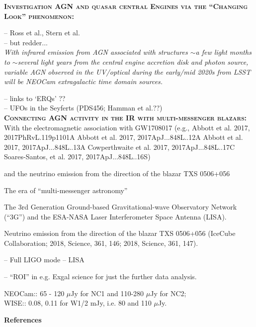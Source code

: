 \documentclass[12pt]{article}
\begin{document}
\smallskip
\smallskip
\noindent
\textbf{\textsc{Investigation AGN and quasar central Engines via the ``Changing Look'' phenomenon:}}

\smallskip
\smallskip
\noindent
-- Ross et al., Stern et al. \\
-- but redder...\\

{\it With infrared emission from AGN associated with structures $\sim$a few light months to $\sim$several light years from the central engine accretion disk and photon source, variable AGN observed in the UV/optical during the early/mid 2020s from LSST will be NEOCam extragalactic time domain sources.}


\smallskip
\smallskip
\noindent
-- links to `ERQs' ?? \\
-- UFOs in the Seyferts (PDS456; Hamman et al.??) \\

\smallskip
\smallskip
\noindent
\textbf{\textsc{Connecting AGN activity in the IR with multi-messenger blazars: }}
With the electromagnetic association with GW1708017 (e.g., 
Abbott et al. 2017,  2017PhRvL.119p1101A	
Abbott et al. 2017,  2017ApJ...848L..12A	
Abbott et al. 2017,  2017ApJ...848L..13A	
Cowperthwaite et al. 2017,  2017ApJ...848L..17C	
Soares-Santos, et al. 2017,  2017ApJ...848L..16S)	

and the neutrino emission from the direction of the blazar TXS 0506+056

The era of ``multi-messenger astronomy'' 

The 3rd Generation Ground-based Gravitational-wave Observatory Network
(``3G'') and the ESA-NASA Laser Interferometer Space Antenna (LISA). 

Neutrino emission from the direction of the blazar TXS 0506+056
(IceCube Collaboration; 
2018, Science, 361, 146; 
2018, Science, 361, 147).


\smallskip
\smallskip
\noindent
-- Full LIGO mode
-- LISA

\smallskip
\smallskip
\noindent


\smallskip
\smallskip
\noindent
-- ``ROI'' in e.g. Exgal science for just the further data analysis. 

\smallskip
\smallskip
\noindent
NEOCam:: 65 -  120 $\mu$Jy for NC1 and 110-280 $\mu$Jy for NC2; \\ 
WISE:: 0.08, 0.11 for W1/2 mJy, i.e. 80 and 110 $\mu$Jy.



\smallskip
\smallskip
\noindent



\pagebreak
\textbf{References}
\end{document}
